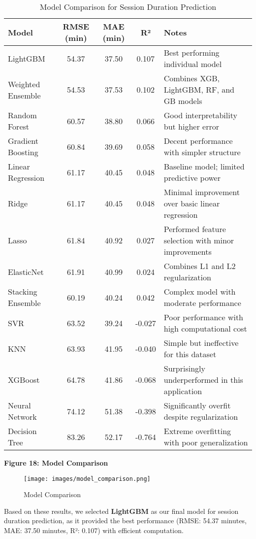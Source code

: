 \documentclass[12pt,letterpaper]{article}
\begin{document}
\begin{table}[H]
\centering
\begin{tabular}{lccc|l}
\toprule
\textbf{Model} & \textbf{RMSE (min)} & \textbf{MAE (min)} & \textbf{R²} & \textbf{Notes} \\
\midrule
LightGBM & 54.37 & 37.50 & 0.107 & Best performing individual model \\
Weighted Ensemble & 54.53 & 37.53 & 0.102 & Combines XGB, LightGBM, RF, and GB models \\
Random Forest & 60.57 & 38.80 & 0.066 & Good interpretability but higher error \\
Gradient Boosting & 60.84 & 39.69 & 0.058 & Decent performance with simpler structure \\
Linear Regression & 61.17 & 40.45 & 0.048 & Baseline model; limited predictive power \\
Ridge & 61.17 & 40.45 & 0.048 & Minimal improvement over basic linear regression \\
Lasso & 61.84 & 40.92 & 0.027 & Performed feature selection with minor improvements \\
ElasticNet & 61.91 & 40.99 & 0.024 & Combines L1 and L2 regularization \\
Stacking Ensemble & 60.19 & 40.24 & 0.042 & Complex model with moderate performance \\
SVR & 63.52 & 39.24 & -0.027 & Poor performance with high computational cost \\
KNN & 63.93 & 41.95 & -0.040 & Simple but ineffective for this dataset \\
XGBoost & 64.78 & 41.86 & -0.068 & Surprisingly underperformed in this application \\
Neural Network & 74.12 & 51.38 & -0.398 & Significantly overfit despite regularization \\
Decision Tree & 83.26 & 52.17 & -0.764 & Extreme overfitting with poor generalization \\
\bottomrule
\end{tabular}
\caption{Model Comparison for Session Duration Prediction}
\end{table}

\textbf{Figure 18: Model Comparison}

\begin{figure}[H]
    \centering
    \texttt{[image: images/model\_comparison.png]}
    \caption{Model Comparison}
\end{figure}

Based on these results, we selected \textbf{LightGBM} as our final model for session duration prediction, as it provided the best performance (RMSE: 54.37 minutes, MAE: 37.50 minutes, R²: 0.107) with efficient computation.
\end{document}

